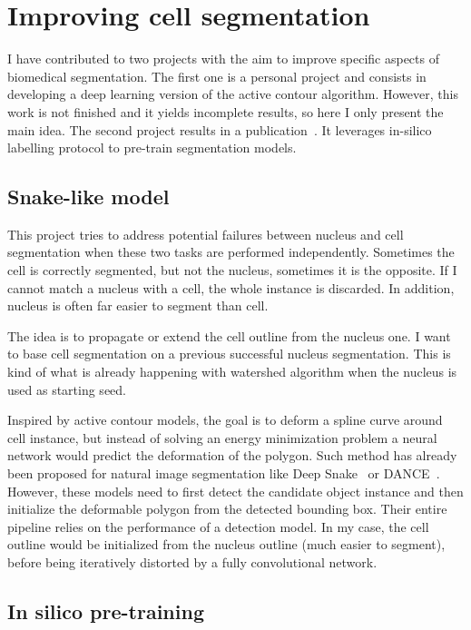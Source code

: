 \section{Improving cell segmentation}
\label{sec:segmentation_improvements}

I have contributed to two projects with the aim to improve specific aspects of biomedical segmentation.
The first one is a personal project and consists in developing a deep learning version of the active contour algorithm.
However, this work is not finished and it yields incomplete results, so here I only present the main idea.
The second project results in a publication~\cite{Bonte_2022}.
It leverages in-silico labelling protocol to pre-train segmentation models.

\subsection{Snake-like model}
\label{subsec:segmentation_snake}

This project tries to address potential failures between nucleus and cell segmentation when these two tasks are performed independently.
Sometimes the cell is correctly segmented, but not the nucleus, sometimes it is the opposite.
If I cannot match a nucleus with a cell, the whole instance is discarded.
In addition, nucleus is often far easier to segment than cell.

The idea is to propagate or extend the cell outline from the nucleus one.
I want to base cell segmentation on a previous successful nucleus segmentation.
This is kind of what is already happening with watershed algorithm when the nucleus is used as starting seed.

Inspired by active contour models, the goal is to deform a spline curve around cell instance, but instead of solving an energy minimization problem a neural network would predict the deformation of the polygon.
Such method has already been proposed for natural image segmentation like Deep Snake~\cite{Peng_2020_CVPR} or DANCE~\cite{Liu_2021}.
However, these models need to first detect the candidate object instance and then initialize the deformable polygon from the detected bounding box.
Their entire pipeline relies on the performance of a detection model.
In my case, the cell outline would be initialized from the nucleus outline (much easier to segment), before being iteratively distorted by a fully convolutional network.

\subsection{In silico pre-training}
\label{subsec:segmentation_insilico}

